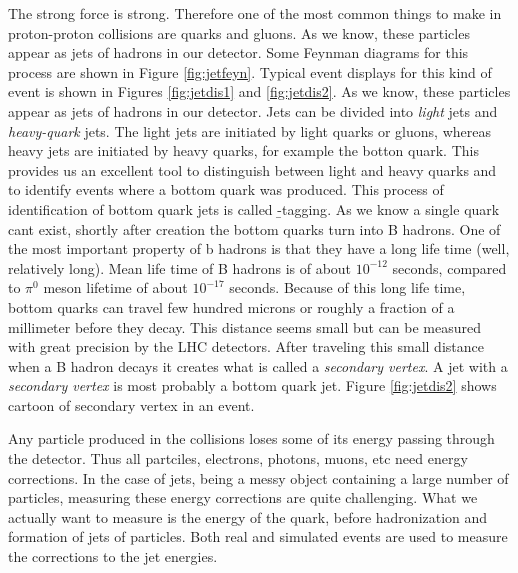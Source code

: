 The strong force is strong.  Therefore one of the most common things to make in proton-proton collisions are quarks and gluons.  As we know, these particles appear as jets of hadrons in our detector.  Some Feynman diagrams for this process are shown in Figure \ref{fig:jetfeyn}.  Typical event displays for this kind of event is shown in Figures \ref{fig:jetdis1} and \ref{fig:jetdis2}.  As we know, these particles appear as jets of hadrons in our detector.  Jets can be divided  into   {\it light} jets   and  {\it heavy-quark}  jets.  The light jets are initiated by light quarks or gluons, whereas heavy jets are initiated by heavy quarks, for example the botton quark.    This provides us an excellent tool to distinguish between light and heavy quarks and to identify events where a bottom quark was produced. This process of identification of bottom quark jets is called {\b-tagging}. As we know a single quark cant exist, shortly after creation the bottom quarks turn into B hadrons. One of the most important property of b hadrons is that they have a long life time (well, relatively long).  Mean life time of B hadrons is of about  $10^{-12}$ seconds, compared to $\pi^0$ meson lifetime of about $10^{-17}$ seconds. Because of this long life time, bottom quarks   can travel  few hundred microns or roughly a fraction of a millimeter before they decay. This distance seems small but can be measured with great precision by the LHC detectors. After traveling this small distance when a B hadron decays it creates what is called   a {\it secondary vertex}.  A jet with a {\it secondary vertex} is most probably a  bottom quark jet.  Figure \ref{fig:jetdis2}  shows cartoon of  secondary vertex in an event.
 

Any particle produced in the collisions loses some of its energy passing through the detector. Thus all partciles, electrons, photons, muons, etc need energy corrections. In the case of jets, being a messy object containing a large number of particles, measuring these energy corrections are quite challenging.  What we actually want to measure is the energy of the quark, before hadronization and formation of jets of particles.  Both real and simulated events are used to measure the corrections to the jet energies.


